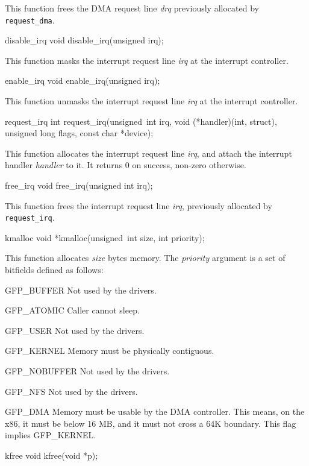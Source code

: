 \begin{icsymlist}
This function frees the DMA request line \emph{drq} previously
allocated by {\tt request_dma}.

\item[disable_irq]
\funcproto void disable_irq(unsigned irq);

This function masks the interrupt request line \emph{irq} at the
interrupt controller.

\item[enable_irq]
\funcproto void enable_irq(unsigned irq);

This function unmasks the interrupt request line \emph{irq} at the
interrupt controller.

\item[request_irq]
\funcproto int request_irq(unsigned~int irq,
			   void (*handler)(int, struct),
			   unsigned long flags,
			   const char *device);

This function allocates the interrupt request line \emph{irq}, and
attach the interrupt handler \emph{handler} to it.  It returns 0 on
success, non-zero otherwise.

\item[free_irq]
\funcproto void free_irq(unsigned int irq);

This function frees the interrupt request line \emph{irq}, previously
allocated by {\tt request_irq}.

\item[kmalloc]
\funcproto void *kmalloc(unsigned~int size, int priority);

This function allocates \emph{size} bytes memory.
The \emph{priority} argument is a set of bitfields defined as follows:
\begin{icsymlist}
\item[GFP_BUFFER]	Not used by the drivers.
\item[GFP_ATOMIC]	Caller cannot sleep.
\item[GFP_USER]		Not used by the drivers.
\item[GFP_KERNEL]	Memory must be physically contiguous.
\item[GFP_NOBUFFER]	Not used by the drivers.
\item[GFP_NFS] 		Not used by the drivers.
\item[GFP_DMA]		Memory must be usable by the DMA controller.
			This means, on the x86, it must be below 16 MB, and
			it must not cross a 64K boundary.  This flag implies
			GFP_KERNEL.
\end{icsymlist}

\item[kfree]
\funcproto void kfree(void *p);


\end{icsymlist}
